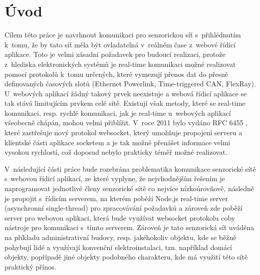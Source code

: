 \chapter{Úvod}
Cílem této práce je navrhnout komunikaci pro senzorickou síť s~přihlédnutím k~tomu, že by tato síť měla být ovladatelná v~reálném čase z~webové řídicí aplikace. Toto je velmi zásadní požadavek pro budoucí realizaci, protože z~hlediska elektronických systémů je real-time  komunikaci možné realizovat pomocí protokolů k~tomu určených, které vymezují přenos dat do přesně definovaných časových slotů (Ethernet Powerlink,  Time-triggered CAN, FlexRay).  U~webových aplikací žádný takový prvek neexistuje a webová řídicí aplikace se tak stává limitujícím prvkem celé sítě. Existují však metody, které se real-time komunikaci, resp. rychlé komunikaci, jak je real-time u~webových aplikací všeobecně chápán, mohou velmi přiblížit. V~roce 2011 bylo vydáno RFC 6455 \cite{rfc6455}, které zastřešuje nový protokol  websocket, který umožňuje propojení serveru a klientské části aplikace socketem a je tak možné přenášet informace velmi vysokou rychlostí, což doposud nebylo prakticky téměř možné realizovat.

V~následující části práce bude rozebrána problematika komunikace senzorické sítě s~webovou řídicí aplikací, ze které vyplyne, že nejvhodnějším řešením je naprogramovat jednotlivé členy senzorické sítě co nejvíce ní\-zko\-ú\-rov\-ňo\-vě, následně je propojit s~řídicím serverem, na kterém poběží  Node.js real-time server (asynchronní single-thread) pro zpracovávání požadavků a zároveň zde poběží server pro webovou aplikaci, která bude využívat websocket protokolu coby nástroje pro komunikaci s~tímto serverem. Zároveň je tato senzorická síť uváděna na příkladu administrativní budovy, resp. jakéhokoliv objektu, kde se běžně pohybují lidé a využívají konvenční elektroinstalaci, tzn. například domácí objekty, popřípadě jiné objekty podobného charakteru, kde má využití této sítě praktický přínos.